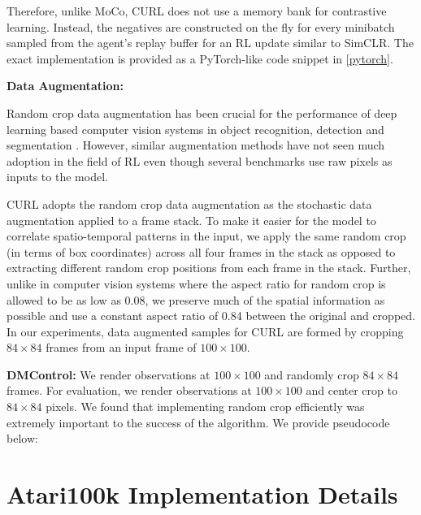 \documentclass{article}
\begin{document}
 Therefore, unlike MoCo, CURL does not use a memory bank for contrastive learning. Instead, the negatives are constructed on the fly for every minibatch sampled from the agent's replay buffer for an RL update similar to SimCLR. The exact implementation is provided as a PyTorch-like code snippet in \ref{pytorch}.


{\textbf{Data Augmentation:}}  


Random crop data augmentation has been crucial for the performance of deep learning based computer vision systems in object recognition, detection and segmentation \cite{krizhevsky2012, szegedy2015, cubuk2019, chen2020simclr}. However, similar augmentation methods have not seen much adoption in the field of RL even though several benchmarks use raw pixels as inputs to the model.

CURL adopts the random crop data augmentation as the stochastic data augmentation applied to a frame stack. To make it easier for the model to correlate spatio-temporal patterns in the input, we apply the same random crop (in terms of box coordinates) across all four frames in the stack as opposed to extracting different random crop positions from each frame in the stack. Further, unlike in computer vision systems where the aspect ratio for random crop is allowed to be as low as 0.08, we preserve much of the spatial information as possible and use a constant aspect ratio of 0.84 between the original and cropped. In our experiments, data augmented samples for CURL are formed by cropping $84\times84$ frames from an input frame of $100\times100$. 

{\textbf{DMControl:}} We render observations at $100 \times 100$ and randomly crop $84 \times 84$ frames. For evaluation, we render observations at $100 \times 100$ and center crop to $84 \times 84$ pixels. We found that implementing random crop efficiently was extremely important to the success of the algorithm. We provide pseudocode below:




\section{Atari100k Implementation Details}
\end{document}
